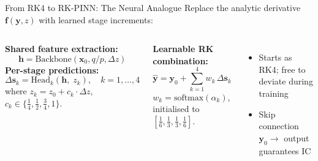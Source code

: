 \documentclass[aspectratio=169, 11pt]{beamer}
\newcommand{\vb}[1]{\bm{#1}}
\begin{document}
\begin{frame}{From RK4 to RK-PINN: The Neural Analogue}
  Replace the analytic derivative $\vb{f}(\vb{y}, z)$ with learned stage increments:
  \begin{columns}[T]
    \textbf{Shared feature extraction:}
    \[
      \vb{h} = \text{Backbone}(\vb{x}_0, q/p, \Delta z)
    \]
    \textbf{Per-stage predictions:}
    \[
      \Delta\vb{s}_k = \text{Head}_k(\vb{h},\; z_k), \quad k = 1,\ldots,4
    \]
    where $z_k = z_0 + c_k \cdot \Delta z$, \; $c_k \in \{\tfrac{1}{4}, \tfrac{1}{2}, \tfrac{3}{4}, 1\}$.

    \textbf{Learnable RK combination:}
    \[
      \hat{\vb{y}} = \vb{y}_0 + \sum_{k=1}^{4} w_k\,\Delta\vb{s}_k
    \]
    $w_k = \text{softmax}(\alpha_k)$, initialised to $[\tfrac{1}{6}, \tfrac{1}{3}, \tfrac{1}{3}, \tfrac{1}{6}]$.
    \begin{itemize}
      \item Starts as RK4; free to deviate during training
      \item Skip connection $\vb{y}_0 \to$ output guarantees IC
    \end{itemize}
  \end{columns}

  \medskip
  \centering
\end{frame}
\end{document}
